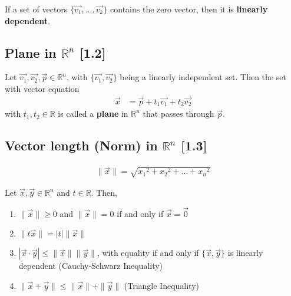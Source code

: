 \documentclass[a4paper,9pt]{extarticle}
\begin{document}
\begin{multicols*}{2}
If a set of vectors $\{\vec{v_1}, ..., \vec{v_k}\}$ contains the zero vector, then it is \textbf{linearly dependent}.


\subsection{Plane in $\mathbb{R}^n$ [1.2]}
Let $\vec{v_1}, \vec{v_2}, \vec{p} \in \mathbb{R}^n$, with $\{\vec{v_1}, \vec{v_2}\}$ being a linearly independent set. Then the set with vector equation
\begin{equation} \label{1.2-5}
    \begin{split}
        \vec{x} & = \vec{p} + t_1 \vec{v_1} + t_2 \vec{v_2}
    \end{split}
\end{equation}
with $t_1,t_2 \in \mathbb{R}$ is called a \textbf{plane} in $\mathbb{R}^n$ that passes through $\vec{p}$.


\subsection{Vector length (Norm) in $\mathbb{R}^n$ [1.3]}
\begin{equation} \label{1.3-1}
    \begin{split}
        \|\vec{x}\| = \sqrt{{x_1}^2 + {x_2}^2 + ... + {x_n}^2}
    \end{split}
\end{equation}

Let $\vec{x}, \vec{y} \in \mathbb{R}^n$ and $t \in \mathbb{R}$. Then,
\begin{enumerate}[label=\bfseries (\arabic*)] \itemsep0pt \parskip0pt 
    \item $\|\vec{x}\| \geq 0$ and $\|\vec{x}\| = 0$ if and only if $\vec{x} = \vec{0}$
    \item $\|t \vec{x}\| = |t| \|\vec{x}\|$
    \item $|\vec{x} \cdot \vec{y}| \leq \|\vec{x}\| \|\vec{y}\|$, with equality if and only if $\{\vec{x}, \vec{y}\}$ is linearly dependent (Cauchy-Schwarz Inequality)
    \item $\|\vec{x} + \vec{y}\| \leq \|\vec{x}\| + \|\vec{y}\|$ (Triangle Inequality)
\end{enumerate}



\end{multicols*}
\end{document}
